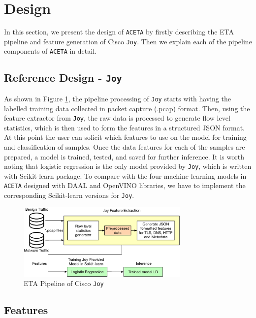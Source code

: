 \section{Design}
\label{sec:design}

In this section, we present the design of \texttt{ACETA} by firstly describing the ETA pipeline and feature generation of Cisco \texttt{Joy}. Then we explain each of the pipeline components of \texttt{ACETA} in detail. 

\subsection{Reference Design - \texttt{Joy}}
As shown in Figure \ref{figure:joy}, the pipeline processing of \texttt{Joy} starts with having the labelled training data collected in packet capture (.pcap) format. Then, using the feature extractor from \texttt{Joy}, the raw data is processed to generate flow level statistics, which is then used to form the features in a structured JSON format. At this point the user can solicit which features to use on the model for training and classification of samples. Once the data features for each of the samples are prepared, a model is trained, tested, and saved for further inference. It is worth noting that logistic regression is the only model provided by \texttt{Joy}, which is written with Scikit-learn package. To compare with the four machine learning models in \texttt{ACETA} designed with DAAL and OpenVINO libraries, we have to implement the corresponding Scikit-learn versions for \texttt{Joy}.

\begin{figure}[h!]
  \centering
  \includegraphics[width=3.3in]{./fig/joy-pipeline.eps}
  \caption{ETA Pipeline of Cisco \texttt{Joy}}
  \label{figure:joy}
\end{figure}

\subsection{Features}

